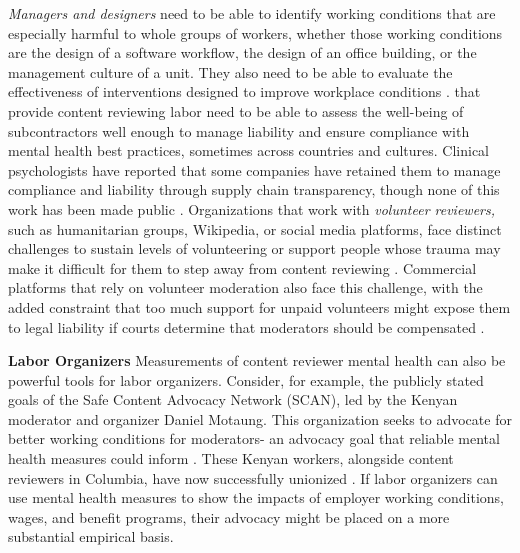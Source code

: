 \textit{Managers and designers} need to be able to identify working conditions that are especially harmful to whole groups of workers, whether those working conditions are the design of a software workflow, the design of an office building, or the management culture of a unit. They also need to be able to evaluate the effectiveness of interventions designed to improve workplace conditions \cite{steiger_psychological_2021}.  that provide content reviewing labor need to be able to assess the well-being of subcontractors well enough to manage liability and ensure compliance with mental health best practices, sometimes across countries and cultures. Clinical psychologists have reported that some companies have retained them to manage compliance and liability through supply chain transparency, though none of this work has been made public \cite{gilbert_what_2022}. Organizations that work with \textit{volunteer reviewers,} such as humanitarian groups, Wikipedia, or social media platforms, face distinct challenges to sustain levels of volunteering or support people whose trauma may make it difficult for them to step away from content reviewing \cite{mcmillen_wikipedia_2016}. Commercial platforms that rely on volunteer moderation also face this challenge, with the added constraint that too much support for unpaid volunteers might expose them to legal liability if courts determine that moderators should be compensated \cite{postigo_emerging_2003, terranova_free_2012, matias_civic_2019}.

\textbf{Labor Organizers}
Measurements of content reviewer mental health can also be powerful tools for labor organizers. Consider, for example, the publicly stated goals of the Safe Content Advocacy Network (SCAN), led by the Kenyan moderator and organizer Daniel Motaung. This organization seeks to advocate for better working conditions for moderators- an advocacy goal that reliable mental health measures could inform \cite{safe_content_advocacy_network}. These Kenyan workers, alongside content reviewers in Columbia, have now successfully unionized \cite{perrigo_150_2023, mcintyre_teleperformance_2023}. If labor organizers can use mental health measures to show the impacts of employer working conditions, wages, and benefit programs, their advocacy might be placed on a more substantial empirical basis.

